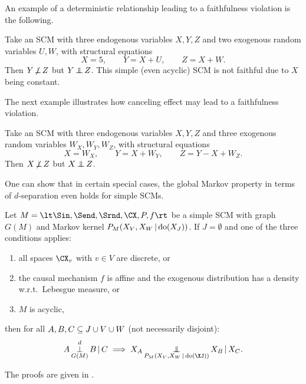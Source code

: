 An example of a deterministic relationship leading to a faithfulness violation is the following.
\begin{Eg}
  Take an SCM with three endogenous variables $X,Y,Z$ and two exogenous random variables $U,W$, with structural equations
  $$X = 5, \qquad Y = X + U, \qquad Z = X + W.$$
  Then $Y \operatorname*{\not\perp} Z$ but $Y \operatorname*{\perp\mkern-11mu\perp} Z$.
  This simple (even acyclic) SCM is not faithful due to $X$ being constant.
\end{Eg}
The next example illustrates how canceling effect may lead to a faithfulness violation.
\begin{Eg}
  Take an SCM with three endogenous variables $X,Y,Z$ and three exogenous random variables $W_X,W_Y,W_Z$, with structural equations
  $$X = W_X, \qquad Y = X + W_Y, \qquad Z = Y - X + W_Z.$$
  Then $X \operatorname*{\not\perp} Z$ but $X \operatorname*{\perp\mkern-11mu\perp} Z$.
\end{Eg}
One can show that in certain special cases, the global Markov property in terms of $d$-separation even holds for simple SCMs.
\begin{Prp}\label{prp:when_d-separation_holds}
  Let $M = \lt \Sin, \Send, \Srnd, \CX, P, f \rt$ be a simple SCM with graph $G(M)$
  and Markov kernel $P_{M}(X_V,X_W \operatorname*{|} \operatorname{do}(X_J))$.
  If $J = \emptyset$ and one of the three conditions applies:
  \begin{enumerate}
    \item all spaces $\CX_v$ with $v \in V$ are discrete, or
    \item the causal mechanism $f$ is affine and the exogenous distribution has a density w.r.t.\ Lebesgue measure, or
    \item $M$ is acyclic,
  \end{enumerate} 
  then for all $A, B, C \subseteq J \cup V \cup W$ (not necessarily disjoint):
  $$A \Perp^d_{G(M)} B \given C \implies X_A \Indep_{P_{M}(X_V,X_W \given \doit(\XJ))} X_B \given X_C.$$
\end{Prp}
The proofs are given in \cite{FM17}.

